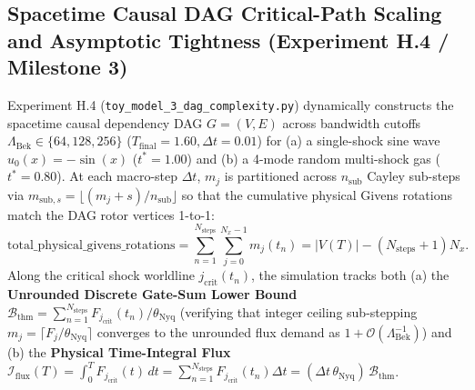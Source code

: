 \documentclass[11pt,a4paper]{article}
\theoremstyle{definition}
\begin{document}
\subsection{Spacetime Causal DAG Critical-Path Scaling and Asymptotic Tightness (Experiment H.4 / Milestone 3)}
Experiment H.4 (\texttt{toy\_\allowbreak{}model\_\allowbreak{}3\_\allowbreak{}dag\_\allowbreak{}complexity.py}) dynamically constructs the spacetime causal dependency DAG $G = (V, E)$ across bandwidth cutoffs $\Lambda_{\text{Bek}} \in \{64, 128, 256\}$ ($T_{\text{final}} = 1.60, \Delta t = 0.01$) for (a) a single-shock sine wave $u_0(x) = -\sin(x)$ ($t^* = 1.00$) and (b) a 4-mode random multi-shock gas ($t^* = 0.80$). At each macro-step $\Delta t$, $m_j$ is partitioned across $n_{\text{sub}}$ Cayley sub-steps via $m_{\text{sub}, s} = \lfloor (m_j + s) / n_{\text{sub}} \rfloor$ so that the cumulative physical Givens rotations match the DAG rotor vertices 1-to-1:
\begin{equation}
\text{total\_physical\_givens\_rotations} = \sum_{n=1}^{N_{\text{steps}}} \sum_{j=0}^{N_x - 1} m_j(t_n) = |V(T)| - (N_{\text{steps}} + 1) N_x.
\end{equation}
Along the critical shock worldline $j_{\text{crit}}(t_n)$, the simulation tracks both (a) the \textbf{Unrounded Discrete Gate-Sum Lower Bound} $\mathcal{B}_{\text{thm}} = \sum_{n=1}^{N_{\text{steps}}} F_{j_{\text{crit}}}(t_n) / \theta_{\text{Nyq}}$ (verifying that integer ceiling sub-stepping $m_j = \lceil F_j / \theta_{\text{Nyq}} \rceil$ converges to the unrounded flux demand as $1 + \mathcal{O}(\Lambda_{\text{Bek}}^{-1})$) and (b) the \textbf{Physical Time-Integral Flux} $\mathcal{I}_{\text{flux}}(T) = \int_0^T F_{j_{\text{crit}}}(t)\,dt = \sum_{n=1}^{N_{\text{steps}}} F_{j_{\text{crit}}}(t_n)\Delta t = (\Delta t \, \theta_{\text{Nyq}})\,\mathcal{B}_{\text{thm}}$.
\end{document}
